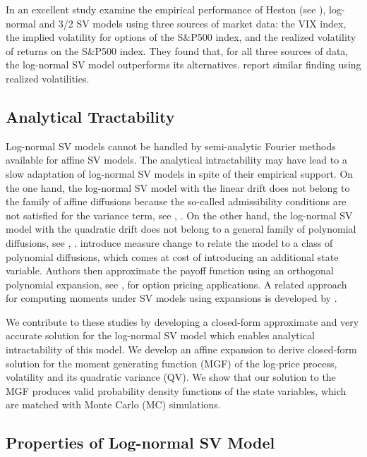 \documentclass[pdftex,11pt,a4paper] {article}
\begin{document}
In an excellent study \cite{Christof2010} examine the empirical performance of Heston (see \cite{Heston1993}), log-normal and 3/2 SV models using three sources of market data: the VIX index, the implied volatility for options of the S\&P500 index, and the realized volatility of returns on the S\&P500 index. They found that, for all three sources of data, the log-normal SV model outperforms its alternatives. \cite{Tegner2018} report similar finding using realized volatilities.  



\subsection{Analytical Tractability}

Log-normal SV models cannot be handled by semi-analytic Fourier methods available for affine SV models. The analytical intractability may have lead to a slow adaptation of log-normal SV models in spite of their empirical support. On the one hand, the log-normal SV model with the linear drift does not belong to the family of affine diffusions because the so-called admissibility conditions are not satisfied for the variance term, see \cite{DuffieFilipSchacer03}, \cite{FilipMayer09}. On the other hand, the log-normal SV model with the quadratic drift does not belong to a general family of polynomial diffusions, see  \cite{Filip16}, \cite{CuchKellRessTeich12}. \cite{CarrWill} introduce measure change to relate the model to a class of polynomial diffusions, which comes at cost of introducing an additional state variable. Authors then approximate the payoff function using an orthogonal polynomial expansion, see \cite{Filip19}, for option pricing applications. A related approach for computing moments under SV models using expansions is developed by \cite{Alos2020}.

We contribute to these studies by developing a closed-form approximate and very accurate solution for the log-normal SV model which enables analytical intractability of this model. We develop an affine expansion to derive closed-form solution for the moment generating function (MGF) of the log-price process, volatility and its quadratic variance (QV). We show that our solution to the MGF produces valid probability density functions of the state variables, which are matched with Monte Carlo (MC) simulations. 




\subsection{Properties of Log-normal SV Model}
\end{document}
